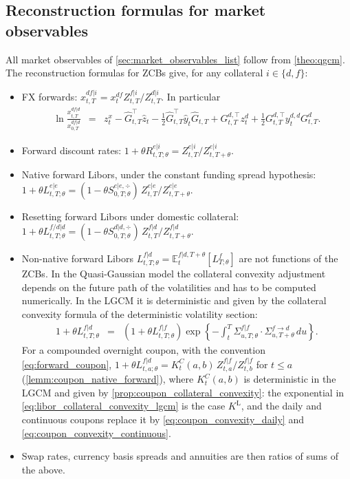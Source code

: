 \documentclass[11pt,english]{amsart}
\newcommand{\EE}{\mathbb{E}}
\theoremstyle{definition}
\begin{document}
\subsection{Reconstruction formulas for market observables}%
All market observables of \autoref{sec:market_observables_list} follow from \autoref{theo:qgcm}. The reconstruction formulas for ZCBs give, for any collateral $i\in\{d,f\}$:
\begin{itemize}
\item FX forwards: $x^{df|i}_{t,T} = x^{df}_t Z^{f|i}_{t,T}/Z^{d|i}_{t,T}$. In particular
\begin{eqnarray}
  \ln \frac{x^{df|d}_{t,T}}{x^{df|d}_{0,T}} &=& z^x_t - \hat{G}^{\top}_{t,T} \hat{z}_t - \frac{1}{2} \hat{G}^{\top}_{t,T}  \hat{y}_t \hat{G}_{t,T}  +  G^{d,\top}_{t,T} z^{d}_t + \frac{1}{2} G^{d,\top}_{t,T}  y^{d,d}_t G^{d}_{t,T} .
\end{eqnarray}
\item Forward discount rates: $1+\theta R^{e|i}_{t,T;\theta} = Z^{e|i}_{t,T}/Z^{e|i}_{t,T+\theta}$.
\item Native forward Libors, under the constant funding spread hypothesis: $1 + \theta L^{e|e}_{t,T;\theta} = (1-\theta S^{e|e,\div}_{0,T;\theta})\, Z^{e|e}_{t,T}/Z^{e|e}_{t,T+\theta}$.
\item Resetting forward Libors under domestic collateral: $1+\theta L^{f/d|d}_{t,T;\theta} = (1-\theta S^{d|d,\div}_{0,T;\theta})\, Z^{f|d}_{t,T}/Z^{f|d}_{t,T+\theta}$.
\item Non-native forward Libors $L^{f|d}_{t,T;\theta} = \EE^{f|d,T+\theta}_t[L^f_{T;\theta}]$ are not functions of the ZCBs. In the Quasi-Gaussian model the collateral convexity adjustment depends on the future path of the volatilities and has to be computed numerically. In the LGCM it is deterministic and given by the collateral convexity formula of the deterministic volatility section:
\begin{eqnarray}
  1+\theta L^{f|d}_{t,T;\theta} &=& \left(1+\theta L^{f|f}_{t,T;\theta}\right) \exp\left\{ - \int_t^T \Sigma^{f|f}_{u,T;\theta}\cdot\Sigma^{f\to d}_{u,T+\theta}\, du \right\} .
  \label{eq:libor_collateral_convexity_lgcm}
\end{eqnarray}
For a compounded overnight coupon, with the convention \eqref{eq:forward_coupon}, $1+\theta L^{f|d}_{t,a;\theta} = K^C_t(a,b)\,Z^{f|f}_{t,a}/Z^{f|f}_{t,b}$ for $t\le a$ (\autoref{lemm:coupon_native_forward}), where $K^C_t(a,b)$ is deterministic in the LGCM and given by \autoref{prop:coupon_collateral_convexity}: the exponential in \eqref{eq:libor_collateral_convexity_lgcm} is the case $K^{\mathrm{L}}$, and the daily and continuous coupons replace it by \eqref{eq:coupon_convexity_daily} and \eqref{eq:coupon_convexity_continuous}.
\item Swap rates, currency basis spreads and annuities are then ratios of sums of the above.
\end{itemize}
\end{document}
